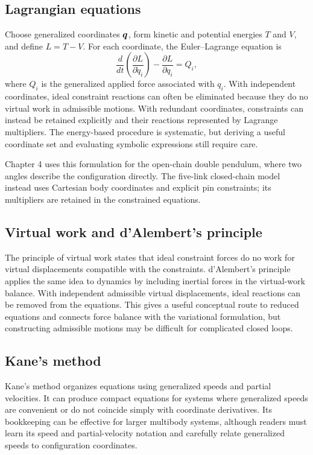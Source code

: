 \documentclass[../main.tex]{subfiles}
\begin{document}
\subsection{Lagrangian equations}

Choose generalized coordinates $\boldsymbol{q}$, form kinetic and potential energies $T$ and $V$, and define $L=T-V$. For each coordinate, the Euler--Lagrange equation is
\begin{equation}
	\frac{d}{dt}\left(\frac{\partial L}{\partial\dot q_i}\right)
	-\frac{\partial L}{\partial q_i}=Q_i,
	\label{eq:chapter1-euler-lagrange}
\end{equation}
where $Q_i$ is the generalized applied force associated with $q_i$. With independent coordinates, ideal constraint reactions can often be eliminated because they do no virtual work in admissible motions. With redundant coordinates, constraints can instead be retained explicitly and their reactions represented by Lagrange multipliers. The energy-based procedure is systematic, but deriving a useful coordinate set and evaluating symbolic expressions still require care.

Chapter 4 uses this formulation for the open-chain double pendulum, where two angles describe the configuration directly. The five-link closed-chain model instead uses Cartesian body coordinates and explicit pin constraints; its multipliers are retained in the constrained equations.

\subsection{Virtual work and d'Alembert's principle}

The principle of virtual work states that ideal constraint forces do no work for virtual displacements compatible with the constraints. d'Alembert's principle applies the same idea to dynamics by including inertial forces in the virtual-work balance. With independent admissible virtual displacements, ideal reactions can be removed from the equations. This gives a useful conceptual route to reduced equations and connects force balance with the variational formulation, but constructing admissible motions may be difficult for complicated closed loops.

\subsection{Kane's method}

Kane's method organizes equations using generalized speeds and partial velocities. It can produce compact equations for systems where generalized speeds are convenient or do not coincide simply with coordinate derivatives. Its bookkeeping can be effective for larger multibody systems, although readers must learn its speed and partial-velocity notation and carefully relate generalized speeds to configuration coordinates.
\end{document}
